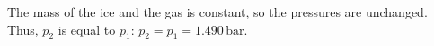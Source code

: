 The mass of the ice and the gas is constant, so the pressures are unchanged.  
Thus, \( p_2 \) is equal to \( p_1 \):  
\( p_2 = p_1 = 1.490 \, \text{bar} \).